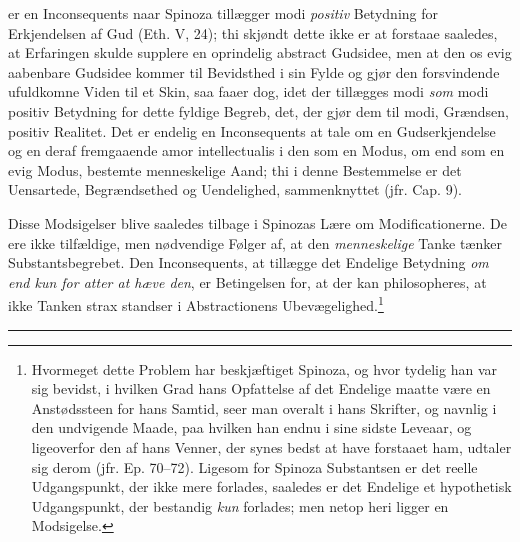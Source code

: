 \documentclass[12pt,a4paper]{book}
\newcommand{\opage}[1]{\marginnote{\footnotesize\textit{[#1]}}}
\begin{document}
er en Inconsequents naar
\opage{64} \setcounter{footnote}{0}%
Spinoza tillægger modi \emph{positiv} Betydning for Erkjendelsen af
Gud (Eth. V, 24); thi skjøndt dette ikke er at forstaae saaledes, at
Erfaringen skulde supplere en oprindelig abstract Gudsidee, men at den
os evig aabenbare Gudsidee kommer til Bevidsthed i sin Fylde og gjør
den forsvindende ufuldkomne Viden til et Skin, saa faaer dog, idet der
tillægges modi \emph{som} modi positiv Betydning for dette fyldige Begreb,
det, der gjør dem til modi, Grændsen, positiv Realitet. Det er
endelig en Inconsequents at tale om en Gudserkjendelse og en deraf
fremgaaende amor intellectualis i den som en Modus, om end som en
evig Modus, bestemte menneskelige Aand; thi i denne Bestemmelse er det
Uensartede, Begrændsethed og Uendelighed, sammenknyttet (jfr. Cap. 9).

Disse Modsigelser blive saaledes tilbage i Spinozas Lære om
Modificationerne. De ere ikke tilfældige, men nødvendige Følger af,
at den \emph{menneskelige} Tanke tænker Substantsbegrebet. Den
Inconsequents, at tillægge det Endelige Betydning \emph{om end kun
for atter at hæve den}, er Betingelsen for, at der kan philosopheres,
at ikke Tanken strax standser i Abstractionens
Ubevægelighed.\footnote{Hvormeget dette Problem har beskjæftiget
Spinoza, og hvor tydelig han var sig bevidst, i hvilken Grad hans
Opfattelse af det Endelige maatte være en Anstødssteen for hans
Samtid, seer man overalt i hans Skrifter, og navnlig i den
undvigende Maade, paa hvilken han endnu i sine sidste Leveaar, og
ligeoverfor den af hans Venner, der synes bedst at have forstaaet ham,
udtaler sig derom (jfr. Ep. 70--72). Ligesom for Spinoza Substantsen
er det reelle Udgangspunkt, der ikke mere forlades, saaledes er det
Endelige et hypothetisk Udgangspunkt, der bestandig \emph{kun} forlades; men
netop heri ligger en Modsigelse.}

\bigskip
\begin{center}\rule{2.5cm}{0.4pt}\end{center}

\newpage

\end{document}
